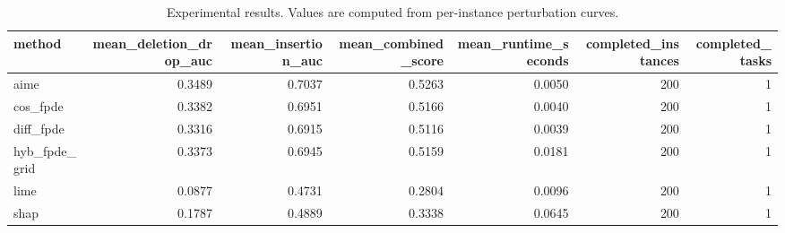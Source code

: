\begin{table}[t]
\caption{Experimental results. Values are computed from per-instance perturbation curves.}
\label{tab:main_results_computed}
\centering
\begin{tabular}{lrrrrrr}
\toprule
method & mean\_deletion\_drop\_auc & mean\_insertion\_auc & mean\_combined\_score & mean\_runtime\_seconds & completed\_instances & completed\_tasks \\
\midrule
aime & 0.3489 & 0.7037 & 0.5263 & 0.0050 & 200 & 1 \\
cos\_fpde & 0.3382 & 0.6951 & 0.5166 & 0.0040 & 200 & 1 \\
diff\_fpde & 0.3316 & 0.6915 & 0.5116 & 0.0039 & 200 & 1 \\
hyb\_fpde\_grid & 0.3373 & 0.6945 & 0.5159 & 0.0181 & 200 & 1 \\
lime & 0.0877 & 0.4731 & 0.2804 & 0.0096 & 200 & 1 \\
shap & 0.1787 & 0.4889 & 0.3338 & 0.0645 & 200 & 1 \\
\bottomrule
\end{tabular}

\end{table}
